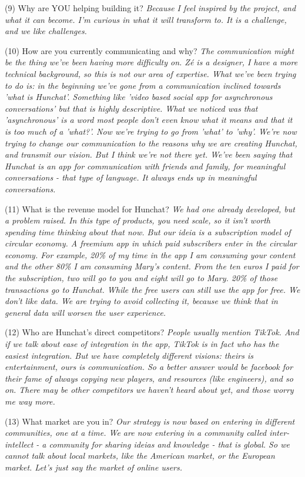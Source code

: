 \documentclass[12pt]{article}
\begin{document}
(9) Why are YOU helping building it? \textit{Because I feel inspired by the project, and what it can become. I'm curious in what it will transform to. It is a challenge, and we like challenges.}

(10) How are you currently communicating and why? \textit{The communication might be the thing we've been having more difficulty on. Zé is a designer, I have a more technical background, so this is not our area of expertise. What we've been trying to do is: in the beginning we've gone from a communication inclined towards 'what is Hunchat'. Something like 'video based social app for asynchronous conversations' but that is highly descriptive. What we noticed was that 'asynchronous' is a word most people don't even know what it means and that it is too much of a 'what?'. Now we're trying to go from 'what' to 'why'. We're now trying to change our communication to the reasons why we are creating Hunchat, and transmit our vision. But I think we're not there yet. We've been saying that Hunchat is an app for communication with friends and family, for meaningful conversations - that type of language. It always ends up in meaningful conversations.}

(11) What is the revenue model for Hunchat? \textit{We had one already developed, but a problem raised. In this type of products, you need scale, so it isn't worth spending time thinking about that now. But our ideia is a subscription model of circular economy.  A freemium app in which paid subscribers enter in the circular economy. For example, 20\% of my time in the app I am consuming your content and the other 80\% I am consuming Mary's content. From the ten euros I paid for the subscription, two will go to you and eight will go to Mary. 20\% of those transactions go to Hunchat. While the free users can still use the app for free. We don't like data. We are trying to avoid collecting it, because we think that in general data will worsen the user experience.}

(12) Who are Hunchat’s direct competitors? \textit{People usually mention TikTok. And if we talk about ease of integration in the app, TikTok is in fact who has the easiest integration. But we have completely different visions: theirs is entertainment, ours is communication. So a better answer would be facebook for their fame of always copying new players, and resources (like engineers), and so on. There may be other competitors we haven't heard about yet, and those worry me way more.}

(13) What market are you in? \textit{Our strategy is now based on entering in different communities, one at a time. We are now entering in a community called inter-intellect - a community for sharing ideias and knowledge - that is global.  So we cannot talk about local markets, like the American market, or the European market. Let's just say the market of online users.}
\end{document}
